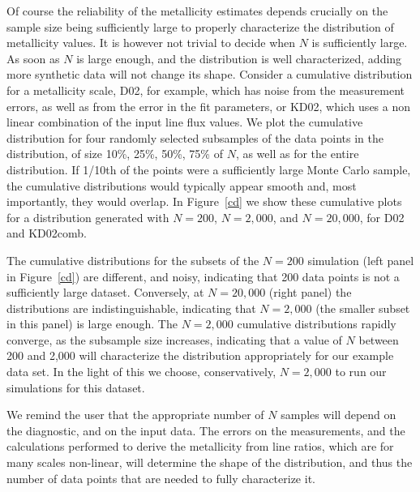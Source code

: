 \documentclass{emulateapj}
\begin{document}
Of course the reliability of the metallicity estimates depends crucially on the sample size being sufficiently large to properly characterize the distribution of metallicity values. It is however not trivial to decide when $N$ is sufficiently large. As soon as $N$ is large enough, and the distribution is well characterized, adding more synthetic data will not change its shape. Consider a cumulative distribution for a metallicity scale, D02, for example, which has noise from the measurement errors, as well as from the error in the fit parameters, or KD02, which uses a non linear combination of the input line flux values. We plot the cumulative distribution for four randomly selected subsamples of the data points in the distribution, of size 10\%, 25\%, 50\%, 75\% of $N$, as well as for the entire distribution. If 1/10th of the points were a sufficiently large Monte Carlo sample, the cumulative distributions would typically appear smooth and, most importantly, they would overlap. In Figure~\ref{cd} we show these cumulative plots for a distribution generated with $N=200$, $N=2,000$, and $N=20,000$, for D02 and KD02comb.

The cumulative distributions for the subsets of the $N=200$ simulation (left panel in Figure~\ref{cd}) are different, and noisy, indicating that 200 data points is not a sufficiently large dataset. Conversely, at $N=20,000$ (right panel) the distributions are indistinguishable, indicating that $N=2,000$ (the smaller subset in this panel) is large enough. The $N=2,000$ cumulative distributions rapidly converge, as the subsample size increases, indicating that a value of $N$ between 200 and 2,000 will characterize the distribution appropriately for our example data set.  In the light of this we choose, conservatively, $N=2,000$ to run our simulations for this dataset. 

We remind the user that the appropriate number of $N$ samples will depend on the diagnostic, and on the input data. The errors on the measurements, and the calculations performed to derive the metallicity from line ratios, which are for many scales non-linear, will determine the shape of the distribution, and thus the number of data points that are needed to fully characterize it. 
\end{document}
